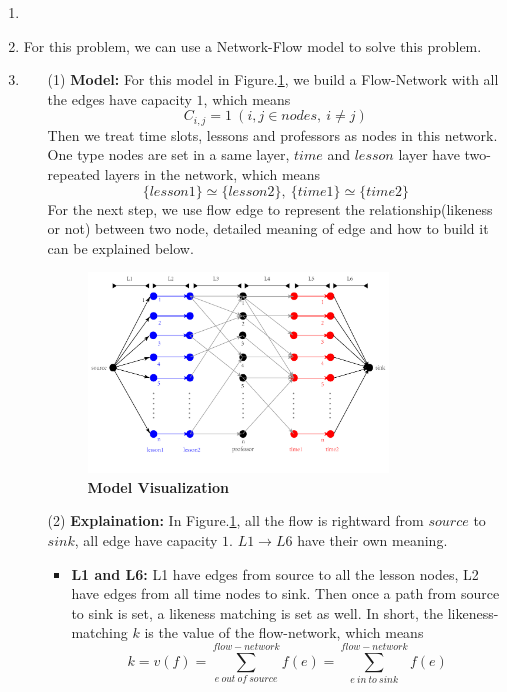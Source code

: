 \documentclass[12pt,a4paper]{article}
\makeatletter
\newtheorem*{solution}{Solution}
\theoremstyle{definition}
\renewenvironment{solution}[1][Solution] {\par\pushQED{\qed}\normalfont\topsep6\p@\@plus6\p@\relax\trivlist\item[\hskip\labelsep\bfseries#1\@addpunct{.}]\ignorespaces}{\popQED\endtrivlist\@endpefalse} \makeatother
\makeatother
\begin{document}
\begin{enumerate}
\begin{solution}\item
\renewcommand{\qedsymbol}{}
For this problem, we can use a Network-Flow model to solve this problem.\item
\begin{itemize}
\item [(1)]\textbf{Model:} For this model in Figure.\ref{Graph0}, we build a Flow-Network with all the edges have capacity $1$, which means
$$C_{i,j}=1\ (i,j\in nodes,\ i\ne j)$$
 Then we treat time slots, lessons and professors as nodes in this network. One type nodes are set in a same layer, $time$ and $lesson$ layer have two-repeated layers in the network, which means
 $$\{lesson1\}\simeq\{lesson2\},\ \{time1\}\simeq\{time2\}$$
 For the next step, we use flow edge to represent the relationship(likeness or not) between two node, detailed meaning of edge and how to build it can be explained below.
\begin{figure}[htbp]
        \centering
        \includegraphics[width=0.8\textwidth]{pictures/1_1.pdf}
        \caption{\textbf{Model Visualization}}\label{Graph0}
        \end{figure}
\item [(2)] \textbf{Explaination:} In Figure.\ref{Graph0}, all the flow is rightward from $source$ to $sink$, all edge have capacity $1$. $L1 \rightarrow L6$ have their own meaning.
\begin{itemize}
\item \textbf{L1 and L6:} L1 have edges from source to all the lesson nodes, L2 have edges from all time nodes to sink. Then once a path from source to sink is set, a likeness matching is set as well. In short, the likeness-matching $k$ is the value of the flow-network, which means
$$k=v(f)=\sum_{e\ out\ of\ source}^{flow-network}f(e)=\sum_{e\ in\ to\ sink}^{flow-network}f(e)$$

\end{itemize}
\end{itemize}
\end{solution}
\end{enumerate}
\end{document}
